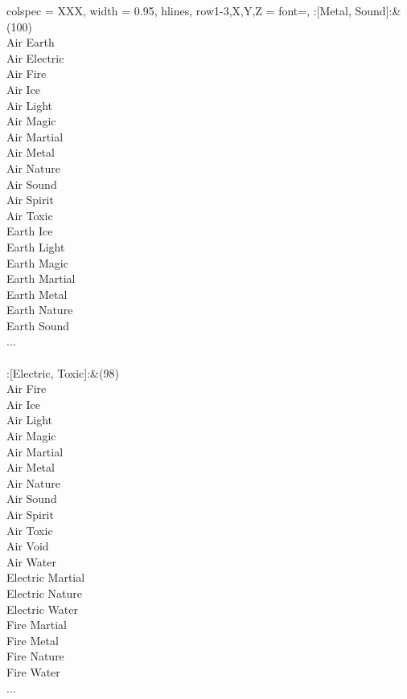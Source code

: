 \begin{longtblr}[
	caption = {2v2 Defending Weak},
	label = {2v2-Defending-Weak},
]{
	colspec = {XXX}, width = 0.95\linewidth,
	hlines,
	row{1-3,X,Y,Z} = {font=\bfseries},
}
	:[Metal, Sound]:&{(100)\\
	Air Earth \\
	Air Electric \\
	Air Fire \\
	Air Ice \\
	Air Light \\
	Air Magic \\
	Air Martial \\
	Air Metal \\
	Air Nature \\
	Air Sound \\
	Air Spirit \\
	Air Toxic \\
	Earth Ice \\
	Earth Light \\
	Earth Magic \\
	Earth Martial \\
	Earth Metal \\
	Earth Nature \\
	Earth Sound \\
	...\\
	}\\

	:[Electric, Toxic]:&{(98)\\
	Air Fire \\
	Air Ice \\
	Air Light \\
	Air Magic \\
	Air Martial \\
	Air Metal \\
	Air Nature \\
	Air Sound \\
	Air Spirit \\
	Air Toxic \\
	Air Void \\
	Air Water \\
	Electric Martial \\
	Electric Nature \\
	Electric Water \\
	Fire Martial \\
	Fire Metal \\
	Fire Nature \\
	Fire Water \\
	...\\
	}\\


\end{longtblr}
